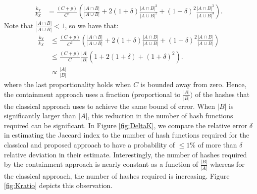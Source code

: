 \documentclass[11pt,reqno]{amsart}
\theoremstyle{remark}
\numberwithin{equation}{section}
\newcommand{\classicX}{X}
\newcommand{\containX}{Y}
\begin{document}
\begin{align}
\frac{ k_\containX}{k_\classicX}
&= \frac{(C+p)}{C^2}\left(\frac{|A\cap B|}{|A\cup B|}+2(1+\delta)\frac{|A\cap B|^2}{|A\cup B|^2}+(1+\delta)^2\frac{|A\cap B|^3}{|A\cup B|^3}\right). \label{eqn:KestOverJest}
\end{align}
Note that $\frac{|A\cap B|}{|A\cup B|} <1$, so we have that:
\begin{align}
\frac{ k_\containX}{k_\classicX} &\leq \frac{(C+p)}{C^2}\left(\frac{|A\cap B|}{|A\cup B|}+2(1+\delta)\frac{|A\cap B|}{|A\cup B|}+(1+\delta)^2\frac{|A\cap B|}{|A\cup B|}\right)\\
&\leq \frac{(C+p)}{C}\frac{|A|}{|B|}\left(1+2(1+\delta)+(1+\delta)^2\right).\\
&\propto \frac{|A|}{|B|} \label{kj/kest}
\end{align}
where the last proportionality holds when $C$ is bounded away from zero.
Hence, the containment approach uses a fraction (proportional to $\frac{|A|}{|B|})$ of the hashes that the classical approach uses to achieve the same bound of error. When $|B|$ is significantly larger than $|A|$, this reduction in the number of hash functions required can be significant. In Figure \ref{fig:DeltaK}, we compare the relative error $\delta$ in estimating the Jaccard index to the number of hash functions required for the classical and proposed approach to have a probability of $\leq 1\%$ of more than $\delta$ relative deviation in their estimate. Interestingly, the number of hashes required by the containment approach is nearly constant as a function of $\frac{|B|}{|A|}$ whereas for the classical approach, the number of hashes required is increasing. Figure \ref{fig:Kratio} depicts this observation.
\end{document}
